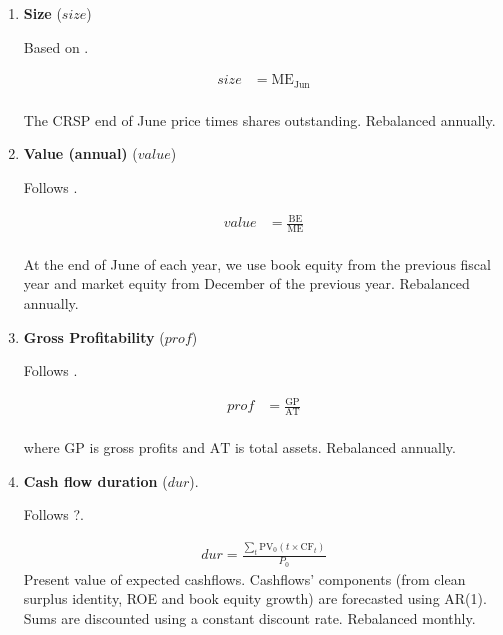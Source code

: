\begin{enumerate}
	\item \textbf{Size} ($size$)
	
	Based on .
	
	\begin{align*}
		size &= \mathrm{ME}_{\text{Jun}} \\
	\end{align*}
	
	The CRSP end of June price times shares outstanding. Rebalanced annually.


	
	\item \textbf{Value (annual)} ($value$)
	
	Follows . 
	
	\begin{align*}
		value &= \frac { \mathrm{BE} }{ \mathrm{ME} } \\
	\end{align*}

	 At the end of June of each year, we use book equity from the previous fiscal year and market equity from December of the previous year. Rebalanced annually.



	\item \textbf{Gross Profitability} ($prof$)
	
	Follows . 
	
	\begin{align*}
		prof &= \frac{ \mathrm{GP} }{ \mathrm{AT} } \\
	\end{align*}
	
	where $\mathrm{GP}$ is gross profits and $\mathrm{AT}$ is total assets. Rebalanced annually.
	
	
	
	\item \textbf{Cash flow duration} ($dur$). 
	
	Follows ?. 
	
	\begin{align*}
		dur = \frac{ \sum_t \mathrm{PV}_0 \left( t \times \mathrm{CF}_t \right) }{ P_0 }
	\end{align*}
	Present value of expected cashflows. Cashflows' components (from clean surplus identity, ROE and book equity growth) are forecasted using AR(1). Sums are discounted using a constant discount rate. Rebalanced monthly.
	
		
	

\end{enumerate}
